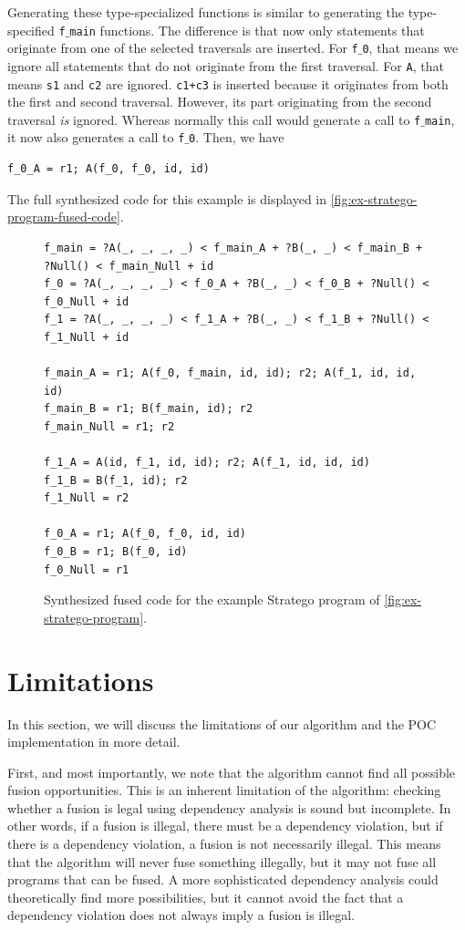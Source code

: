 Generating these type-specialized functions is similar to generating the type-specified \texttt{f$\_$main} functions. The difference is that now only statements that originate from one of the selected traversals are inserted. For \texttt{f$\_$0}, that means we ignore all statements that do not originate from the first traversal. For \texttt{A}, that means \texttt{s1} and \texttt{c2} are ignored. \texttt{c1+c3} is inserted because it originates from both the first and second traversal. However, its part originating from the second traversal \textit{is} ignored. Whereas normally this call would generate a call to \texttt{f$\_$main}, it now also generates a call to \texttt{f$\_$0}. Then, we have

\begin{lstlisting}[style = mystyle_fused_stratego]
    f_0_A = r1; A(f_0, f_0, id, id)
\end{lstlisting}

The full synthesized code for this example is displayed in \autoref{fig:ex-stratego-program-fused-code}.

\begin{figure}
\begin{lstlisting}[style = mystyle_fused_stratego]
f_main = ?A(_, _, _, _) < f_main_A + ?B(_, _) < f_main_B + ?Null() < f_main_Null + id
f_0 = ?A(_, _, _, _) < f_0_A + ?B(_, _) < f_0_B + ?Null() < f_0_Null + id
f_1 = ?A(_, _, _, _) < f_1_A + ?B(_, _) < f_1_B + ?Null() < f_1_Null + id

f_main_A = r1; A(f_0, f_main, id, id); r2; A(f_1, id, id, id)
f_main_B = r1; B(f_main, id); r2
f_main_Null = r1; r2

f_1_A = A(id, f_1, id, id); r2; A(f_1, id, id, id)
f_1_B = B(f_1, id); r2
f_1_Null = r2

f_0_A = r1; A(f_0, f_0, id, id)
f_0_B = r1; B(f_0, id)
f_0_Null = r1
\end{lstlisting}

\caption{Synthesized fused code for the example Stratego program of \autoref{fig:ex-stratego-program}.}
\label{fig:ex-stratego-program-fused-code}
\end{figure}


\section{Limitations}
\label{sec:limitations}
In this section, we will discuss the limitations of our algorithm and the POC implementation in more detail.

First, and most importantly, we note that the algorithm cannot find all possible fusion opportunities. This is an inherent limitation of the algorithm: checking whether a fusion is legal using dependency analysis is sound but incomplete. In other words, if a fusion is illegal, there must be a dependency violation, but if there is a dependency violation, a fusion is not necessarily illegal. This means that the algorithm will never fuse something illegally, but it may not fuse all programs that can be fused. A more sophisticated dependency analysis could theoretically find more possibilities, but it cannot avoid the fact that a dependency violation does not always imply a fusion is illegal.


